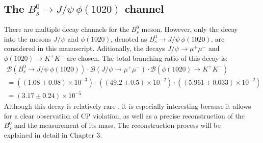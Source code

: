 \subsection{The $B^0_s \to J/\psi \ \phi(1020)$ channel}
There are multiple decay channels for the $B^0_s$ meson. However, only the decay into the mesons $J/\psi$ and $\phi(1020)$, denoted as $B^0_s \to J/\psi \ \phi(1020)$, are considered in this manuscript. Aditionally, the decays $J/\psi \to \mu^{+} \mu^{-}$ and $\phi(1020) \to K^{+} K^{-}$ are chosen. The total branching ratio of this decay is:
\begin{equation}
	\begin{split}
	\mathcal{B} \left(B^0_s \to J/\psi \ \phi(1020) \right) \cdot	\mathcal{B} \left(J/\psi \to \mu^{+} \mu^{-} \right) \cdot \mathcal{B} \left(\phi(1020) \to K^{+} K^{-} \right)  \\
	 = ((1.08 \pm 0.08) \times 10^{-3}) \cdot ((49.2 \pm 0.5) \times 10^{-2}) \cdot ((5.961 \pm 0.033) \times 10^{-2}) \\ = (3.17 \pm 0.24) \times 10^{-5}
	\end{split}
\end{equation}
Although this decay is relatively rare \cite{bragagnolo2021measurement}, it is especially interesting because it allows for a clear observation of CP violation, as well as a precise reconstruction of the $B^0_s$ and the measurement of its mass. The reconstruction process will be explained in detail in Chapter 3.